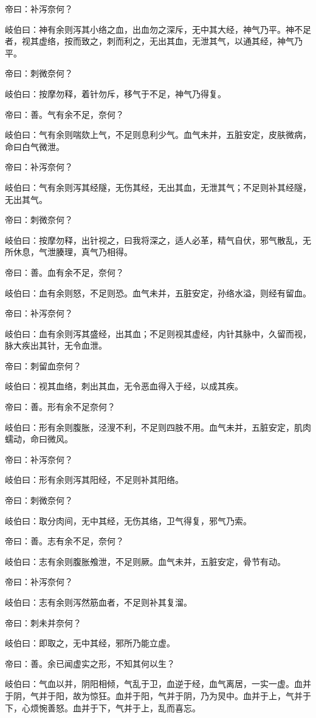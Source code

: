 \documentclass{article}%
\begin{document}
帝曰：补泻奈何？

岐伯曰：神有余则泻其小络之血，出血勿之深斥，无中其大经，神气乃平。神不足者，视其虚络，按而致之，刺而利之，无出其血，无泄其气，以通其经，神气乃平。

帝曰：刺微奈何？

岐伯曰：按摩勿释，着针勿斥，移气于不足，神气乃得复。

帝曰：善。气有余不足，奈何？

岐伯曰：气有余则喘欬上气，不足则息利少气。血气未并，五脏安定，皮肤微病，命曰白气微泄。

帝曰：补泻奈何？

岐伯曰：气有余则泻其经隧，无伤其经，无出其血，无泄其气；不足则补其经隧，无出其气。

帝曰：刺微奈何？

岐伯曰：按摩勿释，出针视之，曰我将深之，适人必革，精气自伏，邪气散乱，无所休息，气泄腠理，真气乃相得。

帝曰：善。血有余不足，奈何？

岐伯曰：血有余则怒，不足则恐。血气未并，五脏安定，孙络水溢，则经有留血。

帝曰：补泻奈何？

岐伯曰：血有余则泻其盛经，出其血；不足则视其虚经，内针其脉中，久留而视，脉大疾出其针，无令血泄。

帝曰：刺留血奈何？

岐伯曰：视其血络，刺出其血，无令恶血得入于经，以成其疾。

帝曰：善。形有余不足奈何？

岐伯曰：形有余则腹胀，泾溲不利，不足则四肢不用。血气未并，五脏安定，肌肉蠕动，命曰微风。

帝曰：补泻奈何？

岐伯曰：形有余则泻其阳经，不足则补其阳络。

帝曰：刺微奈何？

岐伯曰：取分肉间，无中其经，无伤其络，卫气得复，邪气乃索。

帝曰：善。志有余不足，奈何？

岐伯曰：志有余则腹胀飧泄，不足则厥。血气未并，五脏安定，骨节有动。

帝曰：补泻奈何？

岐伯曰：志有余则泻然筋血者，不足则补其复溜。

帝曰：刺未并奈何？

岐伯曰：即取之，无中其经，邪所乃能立虚。

帝曰：善。余已闻虚实之形，不知其何以生？

岐伯曰：气血以并，阴阳相倾，气乱于卫，血逆于经，血气离居，一实一虚。血并于阴，气并于阳，故为惊狂。血并于阳，气并于阴，乃为炅中。血并于上，气并于下，心烦惋善怒。血并于下，气并于上，乱而喜忘。
\end{document}
